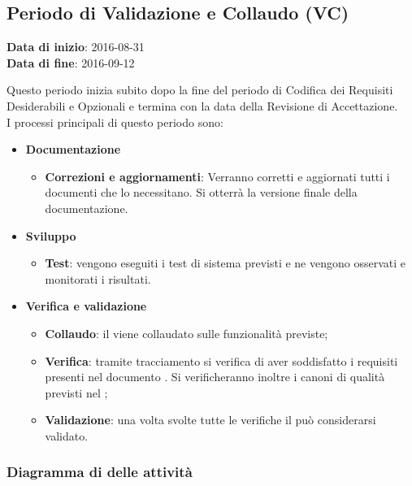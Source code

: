 	\subsection{Periodo di Validazione e Collaudo (VC)}
	\begin{center}
		\textbf{Data di inizio}: 2016-08-31 \\
		\textbf{Data di fine}: 2016-09-12 \\
	\end{center}
	Questo periodo inizia subito dopo la fine del periodo di Codifica dei Requisiti Desiderabili e Opzionali e termina con la data della Revisione di Accettazione. \\
	I processi principali di questo periodo sono:
		\begin{itemize}
			\item \textbf{Documentazione}
			\att
			\begin{itemize}
				\item \textbf{Correzioni e aggiornamenti}: Verranno corretti e aggiornati tutti i documenti che lo necessitano. Si otterrà la versione finale della documentazione. 
			\end{itemize}
			\item \textbf{Sviluppo}
			\att
				\begin{itemize}
					\item \textbf{Test}: vengono eseguiti i test di sistema previsti e ne vengono osservati e monitorati i risultati. 
				\end{itemize}
			\item \textbf{Verifica e validazione}
			\att
			\begin{itemize}
				\item \textbf{Collaudo}: il  viene collaudato sulle funzionalità previste;
				\item \textbf{Verifica}: tramite tracciamento si verifica di aver soddisfatto i requisiti presenti nel documento \ARdocRA. Si verificheranno inoltre i canoni di qualità previsti nel \PQdocRA;
				\item \textbf{Validazione}: una volta svolte tutte le verifiche il  può considerarsi validato.
			\end{itemize}
		\end{itemize}
		\subsubsection{Diagramma di  delle attività}
		
